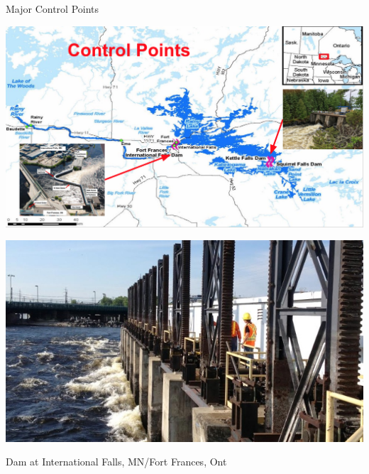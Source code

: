 \documentclass[compress,english]{beamer}
\begin{document}
\begin{frame}{Major Control Points}

\begin{center}
\includegraphics[width=0.9\paperwidth]{ControlPoints}
\end{center}

\end{frame}

{\usebackgroundtemplate%
	{\includegraphics[height=\paperheight]{fort-frances-dam.jpg}}
\begin{frame}{Dam at International Falls, MN/Fort Frances, Ont}	
\end{frame}
}
\end{document}
